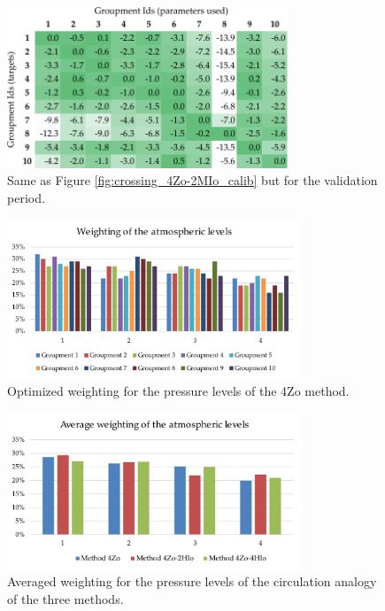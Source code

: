 \documentclass[review]{elsarticle}
\begin{document}
\begin{figure}[t]
	\centerline{\includegraphics[width=8.4cm]{figures/fig14.pdf}}
	\caption{Same as Figure \ref{fig:crossing_4Zo-2MIo_calib} but for the validation period.}
	\label{fig:crossing_4Zo-2MIo_valid}
\end{figure}

\begin{figure}[t]
	\centerline{\includegraphics[width=8.8cm]{figures/fig15.pdf}}
	\caption{Optimized weighting for the pressure levels of the 4Zo method.}
	\label{fig:levels_weights}
\end{figure}

\begin{figure}[t]
	\centerline{\includegraphics[width=8.8cm]{figures/fig16.pdf}}
	\caption{Averaged weighting for the pressure levels of the circulation analogy of the three methods.}
	\label{fig:levels_weights_average}
\end{figure}
\end{document}
